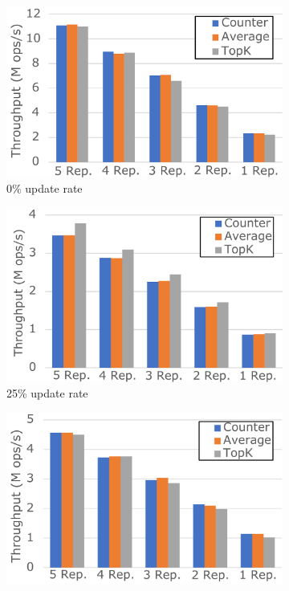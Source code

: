 \documentclass[sigplan,10pt]{acmart}
\begin{document}
\begin{figure}[h]
	\centering
	\begin{subfigure}{.33\linewidth}
		\centering
		\includegraphics[width=.97\linewidth]{CounterAvgTopK0upd_v2_cut}
		\caption{0\% update rate}
		\label{fig:(new)CounterAvgTopK0upd}
	\end{subfigure}%
	\begin{subfigure}{.33\linewidth}
		\centering
		\includegraphics[width=.97\linewidth]{CounterAvgTopK25upd_v2_cut}
		\caption{25\% update rate}
		\label{fig:(new)CounterAvgTopK25upd}
	\end{subfigure}%
	\begin{subfigure}{.33\linewidth}
		\centering
		\includegraphics[width=.97\linewidth]{CounterAvgTopK100upd_v2_cut}

\end{subfigure}
\end{figure}
\end{document}
